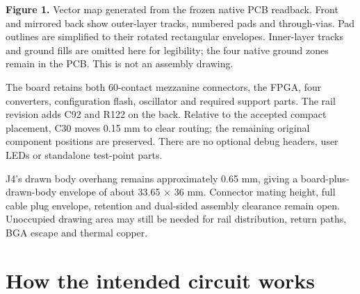 \documentclass[11pt,a4paper]{article}
\begin{document}
\begin{center}
\end{center}
\textbf{Figure 1.} Vector map generated from the frozen native PCB readback. Front and mirrored back show outer-layer tracks, numbered pads and through-vias. Pad outlines are simplified to their rotated rectangular envelopes. Inner-layer tracks and ground fills are omitted here for legibility; the four native ground zones remain in the PCB. This is not an assembly drawing.

The board retains both 60-contact mezzanine connectors, the FPGA, four converters, configuration flash, oscillator and required support parts. The rail revision adds C92 and R122 on the back. Relative to the accepted compact placement, C30 moves 0.15 mm to clear routing; the remaining original component positions are preserved. There are no optional debug headers, user LEDs or standalone test-point parts.

J4's drawn body overhang remains approximately 0.65 mm, giving a board-plus-drawn-body envelope of about 33.65 $\times$ 36 mm. Connector mating height, full cable plug envelope, retention and dual-sided assembly clearance remain open. Unoccupied drawing area may still be needed for rail distribution, return paths, BGA escape and thermal copper.
\clearpage\section{How the intended circuit works}
\end{document}
